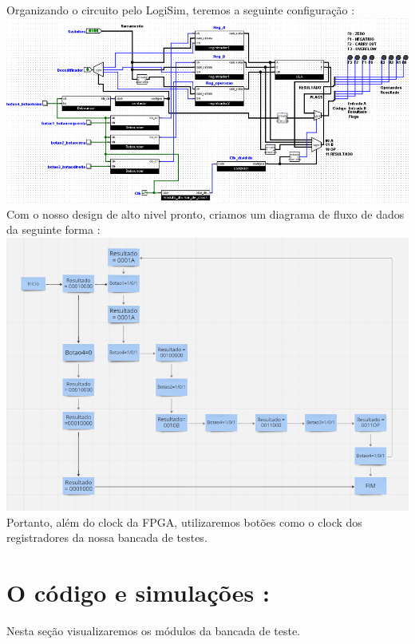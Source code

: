 \documentclass[11pt]{book}
\begin{document}
Organizando o circuito pelo LogiSim, teremos a seguinte configuração : 
\newline\newline
\includegraphics[width=1.2\textwidth]{Design_Completo.png}%
\newline\newline
Com o nosso design de alto nivel pronto, criamos um diagrama de fluxo de dados da seguinte forma : 
\newline\newline
\includegraphics[width=1.1\textwidth]{Diagrama_de_Fluxo.png}%
\newline\newline
Portanto, além do clock da FPGA, utilizaremos botões como o clock dos registradores da nossa bancada de testes. 

\section{O código e simulações : }

Nesta seção visualizaremos os módulos da bancada de teste.
\newline\newline
\end{document}
